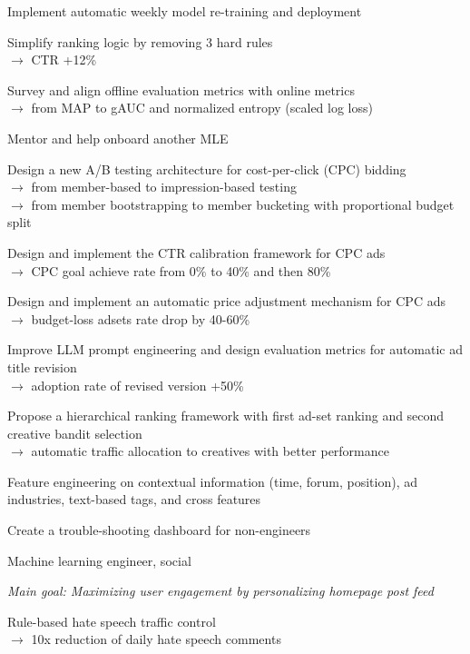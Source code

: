\documentclass[letterpaper,MMMyyyy,nonstopmode]{simpleresumecv}
\begin{document}
\begin{Body}
\SubBulletItem
Implement automatic weekly model re-training and deployment

\SubBulletItem
Simplify ranking logic by removing 3 hard rules \\
$\rightarrow$ CTR +12\%

\SubBulletItem
Survey and align offline evaluation metrics with online metrics \\
$\rightarrow$ from MAP to gAUC and normalized entropy (scaled log loss)

\SubBulletItem
Mentor and help onboard another MLE

\SubBulletItem
Design a new A/B testing architecture for cost-per-click (CPC) bidding \\
$\rightarrow$ from member-based to impression-based testing \\
$\rightarrow$ from member bootstrapping to member bucketing with proportional budget split

\SubBulletItem
Design and implement the CTR calibration framework for CPC ads \\
$\rightarrow$ CPC goal achieve rate from 0\% to 40\% and then 80\% 

\SubBulletItem
Design and implement an automatic price adjustment mechanism for CPC ads \\
$\rightarrow$ budget-loss adsets rate drop by 40-60\%

\SubBulletItem
Improve LLM prompt engineering and design evaluation metrics for automatic ad title revision \\
$\rightarrow$ adoption rate of revised version +50\%

\SubBulletItem
Propose a hierarchical ranking framework with first ad-set ranking and second creative bandit selection \\
$\rightarrow$ automatic traffic allocation to creatives with better performance

\SubBulletItem
Feature engineering on contextual information (time, forum, position), ad industries, text-based tags, and cross features

\SubBulletItem
Create a trouble-shooting dashboard for non-engineers

\Gap
\BulletItem
Machine learning engineer, social

\SubBulletItem
\textit{Main goal: Maximizing user engagement by personalizing homepage post feed}


\SubBulletItem
Rule-based hate speech traffic control \\
$\rightarrow$ 10x reduction of daily hate speech comments


\end{Body}
\end{document}
